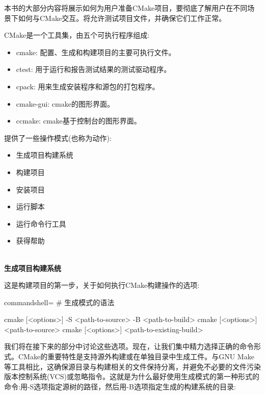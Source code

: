 
本书的大部分内容将展示如何为用户准备CMake项目，要彻底了解用户在不同场景下如何与CMake交互。将允许测试项目文件，并确保它们工作正常。

CMake是一个工具集，由五个可执行程序组成:

\begin{itemize}
\item 
cmake: 配置、生成和构建项目的主要可执行文件。

\item 
ctest: 用于运行和报告测试结果的测试驱动程序。

\item 
cpack: 用来生成安装程序和源包的打包程序。

\item 
cmake-gui: cmake的图形界面。

\item 
ccmake: cmake基于控制台的图形界面。
\end{itemize}


提供了一些操作模式(也称为动作):

\begin{itemize}
\item 
生成项目构建系统

\item 
构建项目

\item 
安装项目

\item 
运行脚本

\item 
运行命令行工具

\item 
获得帮助
\end{itemize}

\hspace*{\fill} \\ %
\noindent
\textbf{生成项目构建系统}

这是构建项目的第一步，关于如何执行CMake构建操作的选项:

\begin{tcblisting}{commandshell={}}
# 生成模式的语法

cmake [<options>] -S <path-to-source> -B <path-to-build>
cmake [<options>] <path-to-source>
cmake [<options>] <path-to-existing-build>
\end{tcblisting}

我们将在接下来的部分中讨论这些选项。现在，让我们集中精力选择正确的命令形式。CMake的重要特性是支持源外构建或在单独目录中生成工件。与GNU Make等工具相比，这确保源目录与构建相关的文件保持分离，并避免不必要的文件污染版本控制系统(VCS)或忽略指令。这就是为什么最好使用生成模式的第一种形式的命令:用-S选项指定源树的路径，然后用-B选项指定生成的构建系统的目录:

